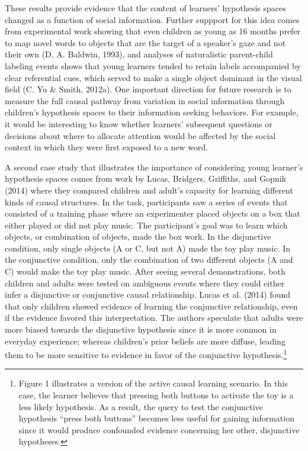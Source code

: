 \documentclass[english,floatsintext,man]{apa6}
\newcounter{author}
\theoremstyle{definition}
\theoremstyle{definition}
\theoremstyle{definition}
\theoremstyle{remark}
\begin{document}
These results provide evidence that the content of learners' hypothesis
spaces changed as a function of social information. Further suppport for
this idea comes from experimental work showing that even children as
young as 16 months prefer to map novel words to objects that are the
target of a speaker's gaze and not their own (D. A. Baldwin, 1993), and
analyses of naturalistic parent-child labeling events shows that young
learners tended to retain labels accompanied by clear referential cues,
which served to make a single object dominant in the visual field (C. Yu
\& Smith, 2012a). One important direction for future research is to
measure the full causal pathway from variation in social information
through children's hypothesis spaces to their information seeking
behaviors. For example, it would be interesting to know whether
learners' subsequent questions or decisions about where to allocate
attention would be affected by the social context in which they were
first exposed to a new word.

A second case study that illustrates the importance of considering young
learner's hypothesis spaces comes from work by Lucas, Bridgers,
Griffiths, and Gopnik (2014) where they compared children and adult's
capacity for learning different kinds of causal structures. In the task,
participants saw a series of events that consisted of a training phase
where an experimenter placed objects on a box that either played or did
not play music. The participant's goal was to learn which objects, or
combination of objects, made the box work. In the disjunctive condition,
only single objects (A or C, but not A) made the toy play music. In the
conjunctive condition, only the combination of two different objects (A
and C) would make the toy play music. After seeing several
demonstrations, both children and adults were tested on ambiguous events
where they could either infer a disjunctive or conjunctive causal
relationship. Lucas et al. (2014) found that only children showed
evidence of learning the conjunctive relationship, even if the evidence
favored this interpretation. The authors speculate that adults were more
biased towards the disjunctive hypothesis since it is more common in
everyday experience; whereas children's prior beliefs are more diffuse,
leading them to be more sensitive to evidence in favor of the
conjunctive hypothesis.\footnote{Figure 1 illustrates a version of the
  active causal learning scenario. In this case, the learner believes
  that pressing both buttons to activate the toy is a less likely
  hypothesis. As a result, the query to test the conjunctive hypothesis
  \enquote{press both buttons} becomes less useful for gaining
  information since it would produce confounded evidence concerning her
  other, disjunctive hypotheses.}
\end{document}
